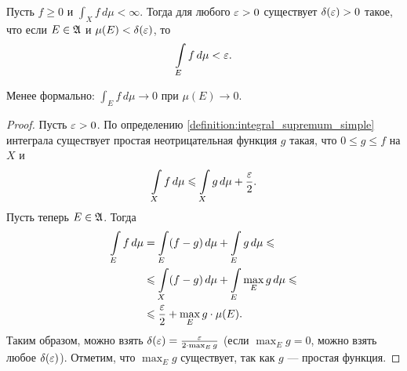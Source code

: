 \begin{claim}
 \label{claim:absolute_continuity_of_integral}
 Пусть $f \geqslant 0$ и $\int_{X} f \, d\mu < \infty$. Тогда для любого $\varepsilon > 0$ существует $\delta(\varepsilon) > 0$ такое, что если $E \in \mathfrak{A}$ и $\mu(E) < \delta(\varepsilon)$, то \begin{align*}
  \int\limits_{E} f \, d\mu < \varepsilon
 .\end{align*} 

 Менее формально: $\int_{E} f \, d\mu \to 0$ при $\mu(E) \to 0$.
\end{claim}
\begin{proof}
 Пусть $\varepsilon > 0$. По определению \ref{definition:integral_supremum_simple} интеграла существует простая неотрицательная функция $g$ такая, что $0 \leqslant g \leqslant f$ на $X$ и \begin{align*}
  \int\limits_{X} f \, d\mu \leqslant \int\limits_{X} g \, d\mu + \frac{\varepsilon}{2}
  .\end{align*} Пусть теперь $E \in \mathfrak{A}$. Тогда \begin{align*}
  \int\limits_{E} f \, d\mu  &= \int\limits_{E} (f-g) \, d\mu + \int\limits_{E} g \, d\mu \leqslant \\ &\leqslant \int\limits_{X} (f-g) \, d\mu + \int\limits_{E} \max_E g \, d\mu \leqslant \\ &\leqslant \frac{\varepsilon }{2} + \max_E g \cdot \mu(E)
 .\end{align*} Таким образом, можно взять $\delta(\varepsilon) = \frac{\varepsilon}{2 \cdot \max_E g}$ (если $\max_E g = 0$, можно взять любое $\delta(\varepsilon)$). Отметим, что $\max_E g$ существует, так как $g$ --- простая функция.
\end{proof}


